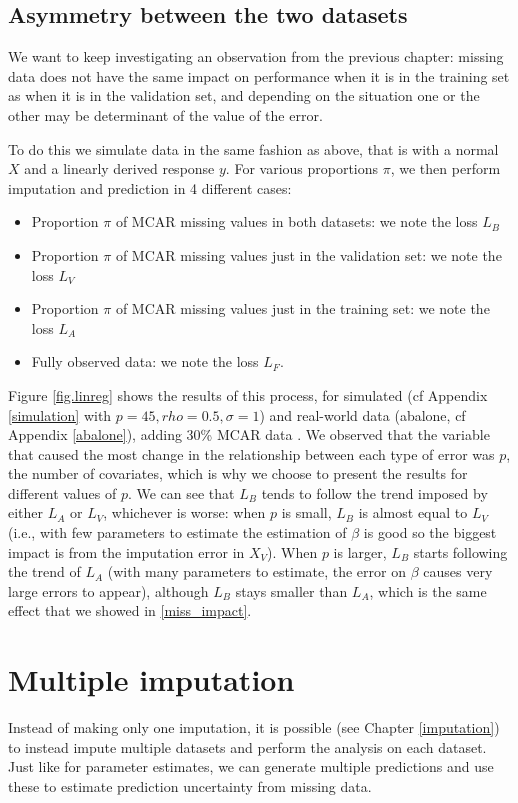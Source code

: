 		\subsection{Asymmetry between the two datasets}
We want to keep investigating an observation from the previous chapter: missing data does not have the same impact on performance when it is in the training set as when it is in the validation set, and depending on the situation one or the other may be determinant of the value of the error.

To do this we simulate data in the same fashion as above, that is with a normal $X$ and a linearly derived response $y$. For various proportions $\pi$, we then perform imputation and prediction in 4 different cases:
\begin{itemize}
\item Proportion $\pi$ of MCAR missing values in both datasets: we note the loss $L_B$
\item Proportion $\pi$ of MCAR missing values just in the validation set: we note the loss $L_V$
\item Proportion $\pi$ of MCAR missing values just in the training set: we note the loss $L_A$
\item Fully observed data: we note the loss $L_F$.
\end{itemize}

Figure \ref{fig.linreg} shows the results of this process, for simulated (cf Appendix \ref{simulation} with $p=45, rho=0.5, \sigma=1$) and real-world data (abalone, cf Appendix \ref{abalone}), adding 30\% MCAR data . We observed that the variable that caused the most change in the relationship between each type of error was $p$, the number of covariates, which is why we choose to present the results for different values of $p$. We can see that $L_B$ tends to follow the trend imposed by either $L_A$ or $L_V$, whichever is worse: when $p$ is small, $L_B$ is almost equal to $L_V$ (i.e., with few parameters to estimate the estimation of $\beta$ is good so the biggest impact is from the imputation error in $X_V$). When $p$ is larger, $L_B$ starts following the trend of $L_A$ (with many parameters to estimate, the error on $\beta$ causes very large errors to appear), although $L_B$ stays smaller than $L_A$, which is the same effect that we showed in \ref{miss_impact}.




	\section{Multiple imputation}
Instead of making only one imputation, it is possible (see Chapter \ref{imputation}) to instead impute multiple datasets and perform the analysis on each dataset. Just like for parameter estimates, we can generate multiple predictions and use these to estimate prediction uncertainty from missing data.

